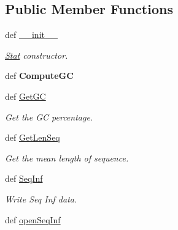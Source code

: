 \subsection*{\-Public \-Member \-Functions}
\begin{DoxyCompactItemize}
\item 
\hypertarget{classMycarn_1_1Stat_1_1Stat_a7a2e4bf8bc3f1351a4ee7180a56c179e}{
def \hyperlink{classMycarn_1_1Stat_1_1Stat_a7a2e4bf8bc3f1351a4ee7180a56c179e}{\-\_\-\-\_\-init\-\_\-\-\_\-}}
\label{classMycarn_1_1Stat_1_1Stat_a7a2e4bf8bc3f1351a4ee7180a56c179e}

\begin{DoxyCompactList}\small\item\em \hyperlink{classMycarn_1_1Stat_1_1Stat}{\-Stat} constructor. \end{DoxyCompactList}\item 
\hypertarget{classMycarn_1_1Stat_1_1Stat_a1e38a3449bbaec3c980cd0bffc3c3e73}{
def {\bfseries \-Compute\-G\-C}}
\label{classMycarn_1_1Stat_1_1Stat_a1e38a3449bbaec3c980cd0bffc3c3e73}

\item 
def \hyperlink{classMycarn_1_1Stat_1_1Stat_a23e8376c1e822d6ca381e106e5b57517}{\-Get\-G\-C}
\begin{DoxyCompactList}\small\item\em \-Get the \-G\-C percentage. \end{DoxyCompactList}\item 
def \hyperlink{classMycarn_1_1Stat_1_1Stat_ab7f93e631a1fa1649b1951605561b897}{\-Get\-Len\-Seq}
\begin{DoxyCompactList}\small\item\em \-Get the mean length of sequence. \end{DoxyCompactList}\item 
\hypertarget{classMycarn_1_1Stat_1_1Stat_aa462420091ff6499ba38dc32bdfc107b}{
def \hyperlink{classMycarn_1_1Stat_1_1Stat_aa462420091ff6499ba38dc32bdfc107b}{\-Seq\-Inf}}
\label{classMycarn_1_1Stat_1_1Stat_aa462420091ff6499ba38dc32bdfc107b}

\begin{DoxyCompactList}\small\item\em \-Write \-Seq \-Inf data. \end{DoxyCompactList}\item 
\hypertarget{classMycarn_1_1Stat_1_1Stat_ada7be2f73953c9e2f0f5fd90d77a3a29}{
def \hyperlink{classMycarn_1_1Stat_1_1Stat_ada7be2f73953c9e2f0f5fd90d77a3a29}{open\-Seq\-Inf}}
\label{classMycarn_1_1Stat_1_1Stat_ada7be2f73953c9e2f0f5fd90d77a3a29}


\end{DoxyCompactItemize}
